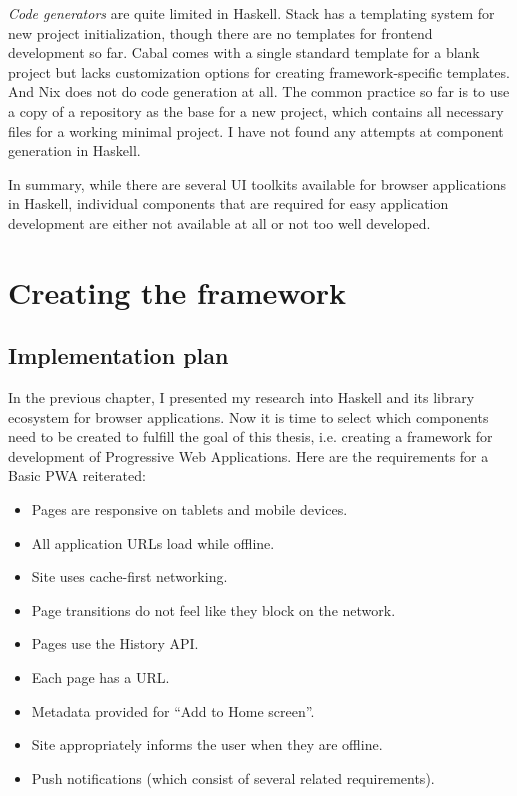 \documentclass[english,zadani,odsaz]{fitthesis}
\begin{document}
\emph{Code generators} are quite limited in Haskell. Stack has a templating system for
new project initialization, though there are no templates for frontend
development so far. Cabal comes with a single standard template for a blank
project but lacks customization options for creating framework-specific
templates. And Nix does not do code generation at all. The common practice so
far is to use a copy of a repository as the base for a new project, which
contains all necessary files for a working minimal project. I have not found any
attempts at component generation in Haskell.

In summary, while there are several UI toolkits available for browser
applications in Haskell, individual components that are required for easy
application development are either not available at all or not too well
developed.

\chapter{Creating the framework}
\label{sec:org42cbbc5}
\section{Implementation plan}
\label{sec:orgdcad0af}
In the previous chapter, I presented my research into Haskell and its library
ecosystem for browser applications. Now it is time to select which components
need to be created to fulfill the goal of this thesis, i.e. creating a framework
for development of Progressive Web Applications. Here are the requirements for a
Basic PWA reiterated:

\begin{itemize}
\item Pages are responsive on tablets and mobile devices.
\item All application URLs load while offline.
\item Site uses cache-first networking.
\item Page transitions do not feel like they block on the network.
\item Pages use the History API.
\item Each page has a URL.
\item Metadata provided for ``Add to Home screen''.
\item Site appropriately informs the user when they are offline.
\item Push notifications (which consist of several related requirements).
\end{itemize}
\end{document}
